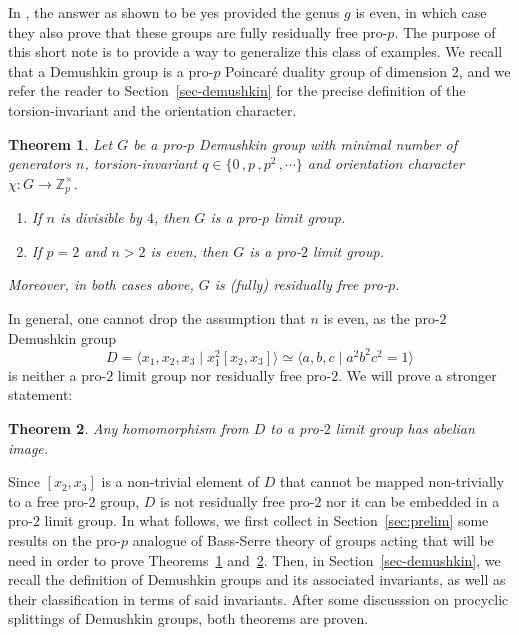 \documentclass[a4paper]{amsart}
\newtheorem{thm}{Theorem}[section]
\theoremstyle{definition}
\begin{document}
In \cite{kochloukovaPropAnaloguesLimit2011}, the answer as shown to be yes provided the genus \(g\) is even, in which case they also prove that these groups are fully residually free pro-\(p\). The purpose of this short note is to provide a way to generalize this class of examples. We recall that a Demushkin group is a pro-\(p\) Poincaré duality group of dimension \(2\), and we refer the reader to Section~\ref{sec-demushkin} for the precise definition of the torsion-invariant and the orientation character.

\begin{thm}\label{thm-demushkin-is-limit} Let \(G\) be a pro-\(p\) Demushkin group with  minimal number of generators \(n\), torsion-invariant \(q \in \{0\,,p\,,p^2\,,\cdots\}\) and orientation character \(\chi\colon G \to \mathbb{Z}_p^\times\).
\begin{enumerate}
    \item If \(n\) is divisible by \(4\), then \(G\) is a pro-\(p\) limit group.
    \item If \(p=2\) and \(n > 2\) is even, then \(G\) is a pro-\(2\) limit group.
\end{enumerate}
Moreover, in both cases above, \(G\) is (fully) residually free pro-\(p\).
\end{thm}

In general, one cannot drop the assumption that \(n\) is even, as the pro-\(2\) Demushkin group \[D = \langle x_1,x_2,x_3\mid x_1^2[x_2,x_3]\rangle \simeq \langle a,b,c\mid a^2b^2c^2 = 1\rangle\] is neither a pro-\(2\) limit group nor residually free pro-\(2\). We will prove a stronger statement:

\begin{thm}\label{thm-three-gen-is-not} Any homomorphism from \(D\) to a pro-\(2\) limit group has abelian image.
\end{thm}

Since \([x_2,x_3]\) is a non-trivial element of \(D\) that cannot be mapped non-trivially to a free pro-\(2\) group, \(D\) is not residually free pro-\(2\) nor it can be embedded in a pro-\(2\) limit group. In what follows, we first collect in Section~\ref{sec:prelim} some results on the pro-\(p\) analogue of Bass-Serre theory of groups acting that will be need in order to prove Theorems~\ref{thm-demushkin-is-limit} and~\ref{thm-three-gen-is-not}. Then, in Section~\ref{sec-demushkin}, we recall the definition of Demushkin groups and its associated invariants, as well as their classification in terms of said invariants. After some discusssion on procyclic splittings of Demushkin groups, both theorems are proven.
\end{document}
